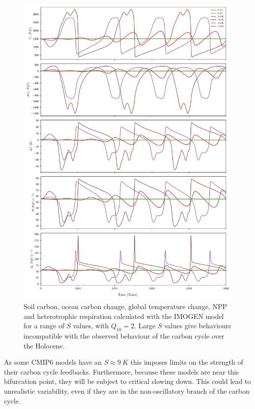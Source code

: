 \begin{figure}
  \centering
  \includegraphics[keepaspectratio,width=\textwidth]{imogen_summary}
  \caption[IMOGEN carbon cycle variables for various $S$ values]{Soil carbon, ocean carbon change, global temperature change, NPP and heterotrophic respiration calculated with the IMOGEN model for a range of $S$ values, with $Q_{10} = 2$. Large $S$ values give behaviours incompatible with the observed behaviour of the carbon cycle over the Holocene.}
  \label{fig:imogen_trajectories_c_cycle}
\end{figure}

As some CMIP6 models have an $S \approx\SI{9}{K}$ this imposes limits on the strength of their carbon cycle feedbacks. Furthermore, because these models are
near this bifurcation point, they will be subject to critical slowing down. This could lead to unrealistic  variability, even if they are
in the non-oscillatory branch of the carbon cycle.

